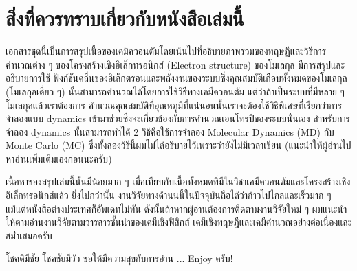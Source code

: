 
{

\chapter*{\centering สิ่งที่ควรทราบเกี่ยวกับหนังสือเล่มนี้}

เอกสารชุดนี้เป็นการสรุปเนื้อของเคมีควอนตัมโดยเน้นไปที่อธิบายภาพรวมของทฤษฎีและวิธีการคำนวณต่าง ๆ 
ของโครงสร้างเชิงอิเล็กทรอนิกส์ (Electron structure) ของโมเลกุล มีการสรุปและอธิบายการใช้%
ฟังก์ชันคลื่นของอิเล็กตรอนและพลังงานของระบบซึ่งคุณสมบัติเกือบทั้งหมดของโมเลกุล (โมเลกุลเดี่ยว ๆ) 
นั้นสามารถคำนวณได้โดยการใช้วิธีทางเคมีควอนตัม แต่ว่าถ้าเป็นระบบที่มีหลาย ๆ โมเลกุลแล้วเราต้องการ%
คำนวณคุณสมบัติที่อุณหภูมิที่แน่นอนนั้นเราจะต้องใช้วิธีพิเศษที่เรียกว่าการจำลองแบบ dynamics 
เข้ามาช่วยซึ่งจะเกี่ยวข้องกับการคำนวณเอนโทรปีของระบบนั่นเอง สำหรับการจำลอง dynamics 
นั้นสามารถทำได้ 2 วิธีคือใช้การจำลอง Molecular Dynamics (MD) กับ Monte Carlo (MC) 
ซึ่งทั้งสองวิธีนี้ผมไม่ได้อธิบายไว้เพราะว่ายังไม่มีเวลาเขียน (แนะนำให้ผู้อ่านไปหาอ่านเพิ่มเติมเองก่อนนะครับ)

เนื้อหาของสรุปเล่มนี้นั้นมีน้อยมาก ๆ เมื่อเทียบกับเนื้อทั้งหมดที่มีในวิชาเคมีควอนตัมและโครงสร้างเชิงอิเล็กทรอนิกส์แล้ว
ยิ่งไปกว่านั้น งานวิจัยทางด้านนนี้ในปัจจุบันถือได้ว่าก้าวไปไกลและเร็วมาก ๆ แม้แต่หนังสือต่างประเทศก็อัพเดทไม่ทัน
ดังนั้นถ้าหากผู้อ่านต้องการติดตามงานวิจัยใหม่ ๆ ผมแนะนำให้ตามอ่านงานวิจัยตามวารสารชั้นนำของเคมีเชิงฟิสิกส์ 
เคมีเชิงทฤษฎีและเคมีคำนวณอย่างต่อเนื่องและสม่ำเสมอครับ

โชคดีมีชัย โชคชัยมีวัว \quad ขอให้มีความสุขกับการอ่าน ... Enjoy ครับ!

}

